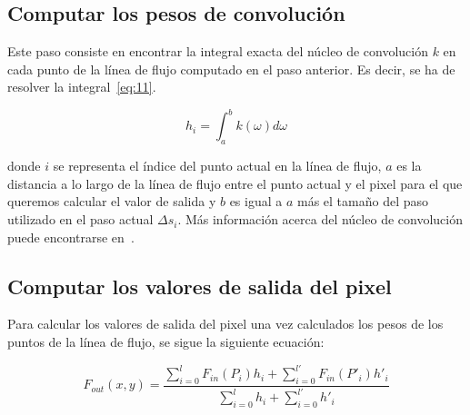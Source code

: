 \subsection{Computar los pesos de convolución}
\label{ref:convolution}

Este paso consiste en encontrar la integral exacta del núcleo de convolución $k$
en cada punto de la línea de flujo computado en el paso anterior. Es decir, se
ha de resolver la integral~\eqref{eq:11}.

\begin{equation}
		h_i = \int_{a}^{b}k(\omega) d\omega \label{eq:11}
\end{equation}

donde $i$ se representa el índice del punto actual en la línea de flujo, $a$
es la distancia a lo largo de la línea de flujo entre el punto actual y el pixel
para el que queremos calcular el valor de salida y $b$ es igual a $a$ más el
tamaño del paso utilizado en el paso actual $\Delta s_i$. Más información acerca
del núcleo de convolución puede encontrarse en~\citet{osti_10185520}.

\subsection{Computar los valores de salida del pixel}
\label{ref:salida}

Para calcular los valores de salida del pixel una vez calculados los pesos de
los puntos de la línea de flujo, se sigue la siguiente ecuación:

\begin{equation}
		F_{out}(x,y) =
		\frac{\sum\limits_{i=0}^{l}{F_{in}(P_i)h_i}+\sum\limits_{i=0}^{l'}{F_{in}(P'_i)h'_i}}{\sum\limits_{i=0}^{l}{h_i} + \sum\limits_{i=0}^{l'}{h'_i}} \label{eq:12}
\end{equation}
